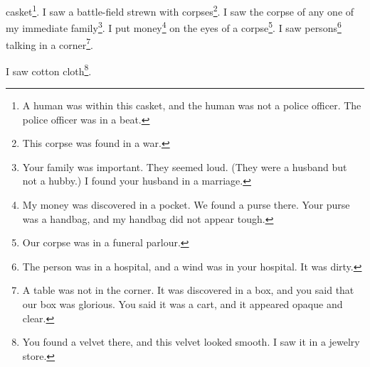 \documentclass[12pt]{book}
\begin{document}
casket\footnote{A human was within this casket, and the human was not a police officer. The police officer was in a beat.}. I saw a battle-field strewn with corpses\footnote{This corpse was found in a war.}. I saw the corpse of any one of my immediate family\footnote{Your family was important. They seemed loud. (They were a husband but not a hubby.) I found your husband in a marriage.}. I put money\footnote{My money was discovered in a pocket. We found a purse there. Your purse was a handbag, and my handbag did not appear tough.} on the eyes of a corpse\footnote{Our corpse was in a funeral parlour.}. I saw persons\footnote{The person was in a hospital, and a wind was in your hospital. It was dirty.} talking in a corner\footnote{A table was not in the corner. It was discovered in a box, and you said that our box was glorious. You said it was a cart, and it appeared opaque and clear.}. 

 I saw cotton cloth\footnote{You found a velvet there, and this velvet looked smooth. I saw it in a jewelry store.}. 
\end{document}
